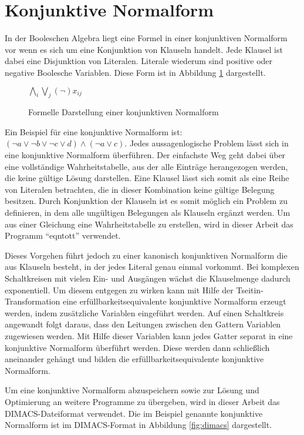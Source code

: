 \section{Konjunktive Normalform}
\label{sec:knf}

In der Booleschen Algebra liegt eine Formel in einer konjunktiven Normalform vor wenn es sich um eine Konjunktion von Klauseln handelt.
Jede Klausel ist dabei eine Disjunktion von Literalen. Literale wiederum sind positive oder negative Boolesche Variablen. Diese Form
ist in Abbildung \ref{fig:knf} dargestellt.

\begin{figure}[!h]
  \centering
  $ \bigwedge\limits_{i} \bigvee\limits_{j} (\neg)x_{ij} $
  \caption{Formelle Darstellung einer konjunktiven Normalform}
  \label{fig:knf}
\end{figure}

Ein Beispiel für eine konjunktive Normalform ist: $ (\neg a \vee \neg b \vee \neg c \vee d) \wedge (\neg a \vee c) $.
Jedes aussagenlogische Problem lässt sich in eine konjunktive Normalform überführen. Der einfachste Weg geht dabei über
eine vollständige Wahrheitstabelle, aus der alle Einträge herangezogen werden, die keine gültige Lösung darstellen. Eine
Klausel lässt sich somit als eine Reihe von Literalen betrachten, die in dieser Kombination keine gültige Belegung besitzen.
Durch Konjunktion der Klauseln ist es somit möglich ein Problem zu definieren, in dem alle ungültigen Belegungen als
Klauseln ergänzt werden. Um aus einer Gleichung eine Wahrheitstabelle zu erstellen, wird in dieser Arbeit das Programm
"`eqntott"' verwendet.

Dieses Vorgehen führt jedoch zu einer kanonisch konjunktiven Normalform die aus Klauseln besteht, in der jedes Literal
genau einmal vorkommt. Bei komplexen Schaltkreisen mit vielen Ein- und Ausgängen wächst die Klauselmenge dadurch exponentiell.
Um diesem entgegen zu wirken kann mit Hilfe der Tseitin-Transformation \cite{tseytin} eine erfüllbarkeitsequivalente
konjunktive Normalform erzeugt werden, indem zusätzliche Variablen eingeführt werden. Auf einen Schaltkreis angewandt folgt daraus,
dass den Leitungen zwischen den Gattern Variablen zugewiesen werden. Mit Hilfe dieser Variablen kann jedes Gatter separat in eine
konjunktive Normalform überführt werden. Diese werden dann schließlich aneinander gehängt und bilden die erfüllbarkeitsequivalente
konjunktive Normalform.

Um eine konjunktive Normalform abzuspeichern sowie zur Lösung und Optimierung an weitere Programme zu übergeben, wird in dieser
Arbeit das DIMACS-Dateiformat verwendet. Die im Beispiel genannte konjunktive Normalform ist im DIMACS-Format in Abbildung
\ref{fig:dimacs} dargestellt.

